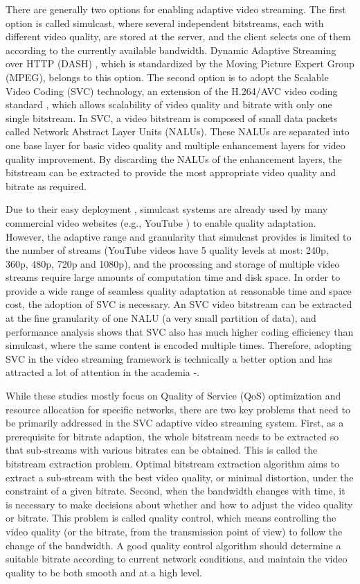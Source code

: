 \documentclass[journal,draftclsnofoot,onecolumn]{IEEEtran}
\begin{document}
There are generally two options for enabling adaptive video streaming. The first option is called simulcast, where several independent bitstreams, each with different video quality, are stored at the server, and the client selects one of them according to the currently available bandwidth. Dynamic Adaptive Streaming over HTTP (DASH) \cite{DASH}, which is standardized by the Moving Picture Expert Group (MPEG), belongs to this option. The second option is to adopt the Scalable Video Coding (SVC) \cite{SVC} technology, an extension of the H.264/AVC video coding standard \cite{SVCOverview}, which allows scalability of video quality and bitrate with only one single bitstream. In SVC, a video bitstream is composed of small data packets called Network Abstract Layer Units (NALUs). These NALUs are separated into one base layer for basic video quality and multiple enhancement layers for video quality improvement. By discarding the NALUs of the enhancement layers, the bitstream can be extracted to provide the most appropriate video quality and bitrate as required.

Due to their easy deployment \cite{Bouten14}, simulcast systems are already used by many commercial video websites (e.g., YouTube \cite{YouTube}) to enable quality adaptation. However, the adaptive range and granularity that simulcast provides is limited to the number of streams (YouTube videos have 5 quality levels at most: 240p, 360p, 480p, 720p and 1080p), and the processing and storage of multiple video streams require large amounts of computation time and disk space. In order to provide a wide range of seamless quality adaptation at reasonable time and space cost, the adoption of SVC is necessary. An SVC video bitstream can be extracted at the fine granularity of one NALU (a very small partition of data), and performance analysis \cite{SVCPerformance} shows that SVC also has much higher coding efficiency than simulcast, where the same content is encoded multiple times. Therefore, adopting SVC in the video streaming framework is technically a better option and has attracted a lot of attention in the academia \cite{Chuah12}-\cite{Cicalo14}.

While these studies mostly focus on Quality of Service (QoS) optimization and resource allocation for specific networks, there are two key problems that need to be primarily addressed in the SVC adaptive video streaming system. First, as a prerequisite for bitrate adaption, the whole bitstream needs to be extracted so that sub-streams with various bitrates can be obtained. This is called the bitstream extraction problem. Optimal bitstream extraction algorithm aims to extract a sub-stream with the best video quality, or minimal distortion, under the constraint of a given bitrate. Second, when the bandwidth changes with time, it is necessary to make decisions about whether and how to adjust the video quality or bitrate. This problem is called quality control, which means controlling the video quality (or the bitrate, from the transmission point of view) to follow the change of the bandwidth. A good quality control algorithm should determine a suitable bitrate according to current network conditions, and maintain the video quality to be both smooth and at a high level.
\end{document}
